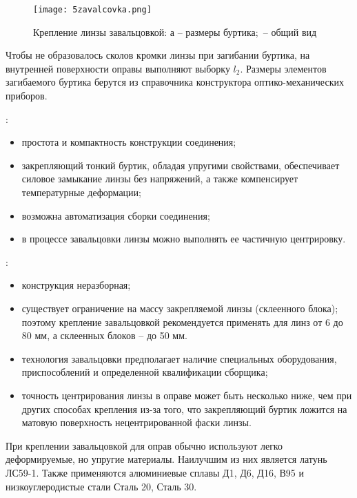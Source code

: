 \begin{figure}[h!]	
	\texttt{[image: 5zavalcovka.png]}
	\caption[Крепление линзы завальцовкой]{Крепление линзы завальцовкой: а -- размеры буртика;~-- общий вид}
	\label{pic:5zavalcovka}
\end{figure}

Чтобы не образовалось сколов кромки линзы при загибании буртика, на внутренней поверхности оправы выполняют выборку $ l_2 $. Размеры элементов загибаемого буртика берутся из справочника конструктора оптико-механических приборов. 

:
\begin{itemize}
	\item простота и компактность конструкции соединения;
	\item закрепляющий тонкий буртик, обладая упругими свойствами, обеспечивает силовое замыкание линзы без напряжений, а также компенсирует температурные деформации;
	\item возможна автоматизация сборки соединения;
	\item в процессе завальцовки линзы можно выполнять ее частичную центрировку.
\end{itemize} 

:
\begin{itemize}
	\item конструкция неразборная; 
	\item существует ограничение на массу закрепляемой линзы (склеенного блока);  поэтому крепление завальцовкой рекомендуется применять для линз от 6 до 80 мм, а склеенных блоков -- до 50 мм.
	\item технология завальцовки предполагает наличие специальных оборудования, приспособлений и определенной квалификации сборщика;
	\item точность центрирования линзы в оправе может быть несколько ниже, чем при других способах крепления из-за того, что закрепляющий буртик ложится на матовую поверхность нецентрированной фаски линзы.
\end{itemize}

При креплении завальцовкой для оправ обычно используют легко деформируемые, но упругие материалы. 
Наилучшим из них является латунь ЛС59-1. 
Также применяются алюминиевые сплавы Д1, Д6, Д16, В95 и низкоуглеродистые стали Сталь 20, Сталь 30.

